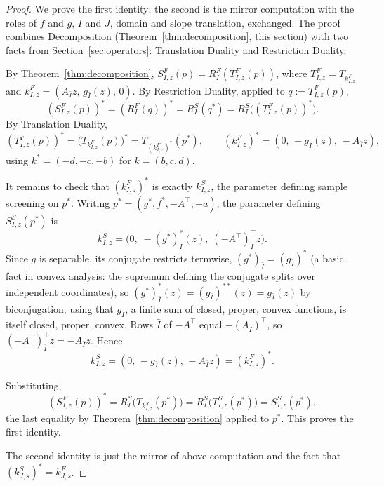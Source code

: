 \begin{proof}
We prove the first identity; the second is the mirror computation with
the roles of \(f\) and \(g\), \(I\) and \(J\), domain and slope
translation, exchanged. The proof combines Decomposition
(Theorem~\ref{thm:decomposition}, this section) with two facts from
Section~\ref{sec:operators}: Translation Duality and Restriction
Duality.

By Theorem~\ref{thm:decomposition}, \(S^F_{I,z}(p)=R^F_I(T^F_{I,z}(p))\),
where \(T^F_{I,z}=T_{k^F_{I,z}}\) and
\(k^F_{I,z}=(A_{\bar I}z,\,g_{\bar I}(z),\,0)\). By Restriction
Duality, applied to \(q:=T^F_{I,z}(p)\),
\[
\left(S^F_{I,z}(p)\right)^*
=
\left(R^F_I(q)\right)^*
=
R^S_I(q^*)
=
R^S_I\bigl((T^F_{I,z}(p))^*\bigr).
\]
By Translation Duality,
\[
(T^F_{I,z}(p))^*
=
\bigl(T_{k^F_{I,z}}(p)\bigr)^*
=
T_{(k^F_{I,z})^*}(p^*),
\qquad
(k^F_{I,z})^*=(0,\,-g_{\bar I}(z),\,-A_{\bar I}z),
\]
using \(k^*=(-d,-c,-b)\) for \(k=(b,c,d)\).

It remains to check that \((k^F_{I,z})^*\) is exactly \(k^S_{I,z}\), the
parameter defining sample screening on \(p^*\). Writing
\(p^*=(g^*,f^*,-A^\top,-a)\), the parameter defining \(S^S_{I,z}(p^*)\)
is
\[
k^S_{I,z}
=
\bigl(0,\;-(g^*)_{\bar I}^{*}(z),\;(-A^\top)_{\bar I}^\top z\bigr).
\]
Since \(g\) is separable, its conjugate restricts termwise,
\((g^*)_{\bar I}=(g_{\bar I})^*\) (a basic fact in convex analysis: the
supremum defining the conjugate splits over independent coordinates),
so \((g^*)_{\bar I}^{*}(z)=(g_{\bar I})^{**}(z)=g_{\bar I}(z)\) by
biconjugation, using that \(g_{\bar I}\), a finite sum of closed,
proper, convex functions, is itself closed, proper, convex. Rows \(\bar I\) of
\(-A^\top\) equal \(-(A_{\bar I})^\top\), so \((-A^\top)_{\bar
I}^\top z=-A_{\bar I}z\).
Hence
\[
k^S_{I,z}=(0,\,-g_{\bar I}(z),\,-A_{\bar I}z)=(k^F_{I,z})^*.
\]

Substituting,
\[
\left(S^F_{I,z}(p)\right)^*
=
R^S_I\bigl(T_{k^S_{I,z}}(p^*)\bigr)
=
R^S_I\bigl(T^S_{I,z}(p^*)\bigr)
=
S^S_{I,z}(p^*),
\]
the last equality by Theorem~\ref{thm:decomposition} applied to \(p^*\).
This proves the first identity.

The second identity is just the mirror of above computation and the fact that \((k^S_{J,s})^*=k^F_{J,s}\).
\end{proof}


